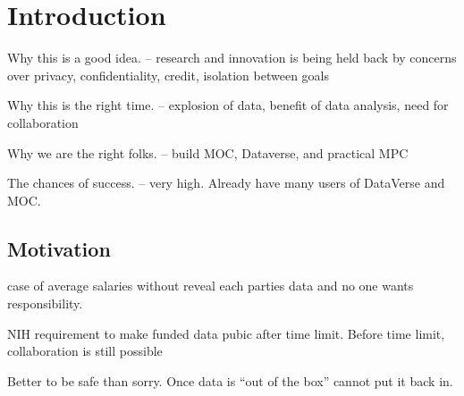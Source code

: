 \section{Introduction}

Why this is a good idea. -- research and innovation is being held back by concerns over privacy, confidentiality, credit, isolation between goals

Why this is the right time. -- explosion of data, benefit of data analysis,  need for collaboration

Why we are the right folks. -- build MOC, Dataverse, and practical MPC

The chances of success. -- very high.  Already have many users of DataVerse and MOC.  

\subsection{Motivation}

case of average salaries without reveal each parties data and no one wants responsibility.

NIH requirement to make funded data pubic after time limit.   Before time limit, collaboration is still possible

Better to be safe than sorry.  Once data is ``out of the box'' cannot put it back in.